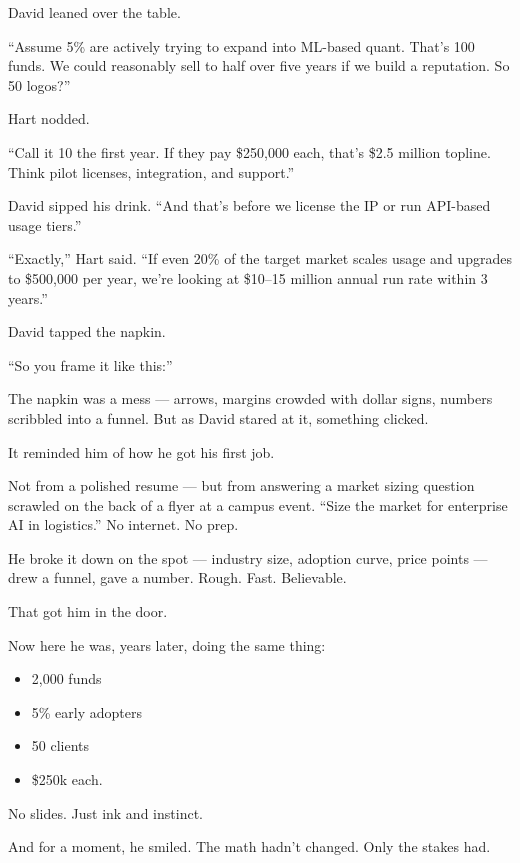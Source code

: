 David leaned over the table.

``Assume 5\% are actively trying to expand into ML-based quant. That’s 100 funds.  
We could reasonably sell to half over five years if we build a reputation. So 50 logos?''

Hart nodded.

``Call it 10 the first year. If they pay \$250{,}000 each, that’s \$2.5 million topline.  
Think pilot licenses, integration, and support.''

David sipped his drink. ``And that’s before we license the IP or run API-based usage tiers.''

``Exactly,'' Hart said. ``If even 20\% of the target market scales usage and upgrades to \$500{,}000 per year,  
we’re looking at \$10–15 million annual run rate within 3 years.''

David tapped the napkin.

``So you frame it like this:''

The napkin was a mess — arrows, margins crowded with dollar signs, numbers scribbled into a funnel. But as David 
stared at it, something clicked.

It reminded him of how he got his first job.

Not from a polished resume — but from answering a market sizing question scrawled on the back of a flyer at a campus event.
“Size the market for enterprise AI in logistics.” No internet. No prep.

He broke it down on the spot — industry size, adoption curve, price points — drew a funnel, gave a number.
Rough. Fast. Believable.

That got him in the door.

Now here he was, years later, doing the same thing:
\begin{itemize}
    \item 2,000 funds 
    \item 5\% early adopters 
    \item 50 clients 
    \item \$250k each.
\end{itemize}

No slides. Just ink and instinct.

And for a moment, he smiled.
The math hadn’t changed.
Only the stakes had.

\medskip

